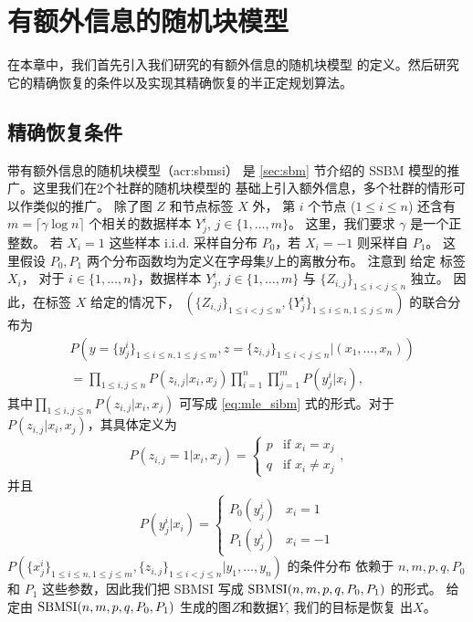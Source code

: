 \chapter{有额外信息的随机块模型}
\label{chap:sbmsi}
在本章中，我们首先引入我们研究的有额外信息的随机块模型
的定义。然后研究它的精确恢复的条件以及实现其精确恢复的半正定规划算法。

\section{精确恢复条件}
\label{sec:sbmsi_exact_recovery_condtion}
带有额外信息的随机块模型（\gls{acr:sbmsi}）
是 \ref{sec:sbm} 节介绍的
SSBM 模型的推广。这里我们在2个社群的随机块模型的
基础上引入额外信息，多个社群的情形可以作类似的推广。
除了图 $Z$ 和节点标签 $X$ 外，
第 $i$  个节点 ($1\leq i \leq n$) 
还含有 $m=\lceil \gamma \log n \rceil $ 个相关的数据样本 
$Y^{i}_{j}$, $j\in \{1,\ldots,m\}$。
这里，我们要求 $\gamma$ 是一个正整数。
若 $X_i=1$
这些样本 i.i.d. 采样自分布 $P_0$，若  $X_i=-1$ 则采样自 $P_1$。
这里假设 $P_0, P_1$ 两个分布函数均为定义在字母集$\mathcal{Y}$上的离散分布。
注意到 给定 标签 $X_i$，
对于 $i\in\{1,\ldots,n\}$，数据样本 $Y^{i}_{j}$, $j\in \{1,\ldots,m\}$ 与 $\{Z_{i,j}\}_{1\le i<j\le n}$ 独立。
 因此，在标签 $X$ 给定的情况下，
  $(\{Z_{i,j}\}_{1\le i<j\le n},\{Y^i_{j}\}_{1\le i\le n,1\le j\le m})$ 的联合分布为  
\begin{align}\label{eq:lh}
    &P(y=\{y^i_{j}\}_{1\le i\le n,1\le j\le m},z=\{z_{i,j}\}_{1\le i<j\le n}| (x_1,\ldots,x_n)) \nonumber\\
    &= \prod_{1\le i,j\le n}P(z_{i,j}|x_i,x_j)\prod_{i=1}^n \prod_{j=1}^m P(y^i_j|x_i), 
\end{align}
其中$\prod_{1\le i,j\le n}P(z_{i,j}|x_i,x_j)$ 可写成
\eqref{eq:mle_sibm} 式的形式。对于$P(z_{i,j}|x_i,x_j)$，其具体定义为
\begin{equation*}
    P  (z_{i,j}=1|x_i,x_j) = \begin{cases}
        p & \text{if } x_i = x_j \\
        q & \text{if } x_i\ne x_j
    \end{cases},
\end{equation*}
并且
\begin{equation*}
    P(y^i_j|x_i) = \begin{cases}
        P_0(y^i_j) & x_i = 1 \\
        P_1(y^i_j) & x_i = -1
    \end{cases}
\end{equation*}
 $P(\{x^i_{j}\}_{1\le i\le n,1\le j\le m},\{z_{i,j}\}_{1\le i<j\le n}| y_1,\ldots,y_n)$ 
 的条件分布 依赖于
 $n,m,p, q, P_0$ 和 $P_1$ 这些参数，因此我们把 SBMSI 写成 $\operatorname{SBMSI}(n,m,p,q,P_0,P_1)$ 的形式。
 给定由 $\operatorname{SBMSI}(n,m,p,q,P_0,P_1)$ 生成的图$Z$和数据$Y$, 我们的目标是恢复 出$X$。
 
